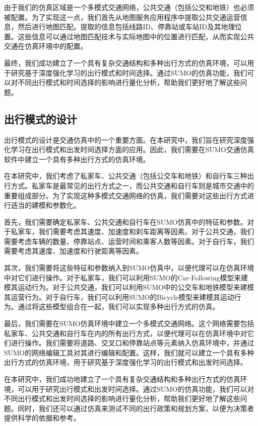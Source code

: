 由于我们的仿真区域是一个多模式交通网络，公共交通（包括公交和地铁）也必须被配置。为了实现这一点，我们首先从地图服务应用程序中提取公共交通运营信息，然后进行地图匹配。提取的信息包括线路ID、停靠站或车站ID及其地理位置。这些信息可以通过地图匹配技术与实际地图中的位置进行匹配，从而实现公共交通在仿真环境中的配置。

最终，我们成功建立了一个具有复杂交通结构和多种出行方式的仿真环境，可以用于研究基于深度强化学习的出行模式和时间选择。通过SUMO的仿真功能，我们可以对不同出行模式和时间选择的影响进行量化分析，帮助我们更好地了解这些问题。

\subsection{出行模式的设计}

出行模式的设计是交通仿真中的一个重要方面。在本研究中，我们旨在研究深度强化学习在出行模式和出发时间选择方面的应用。因此，我们需要在SUMO交通仿真软件中建立一个具有多种出行方式的仿真环境。

在本研究中，我们考虑了私家车、公共交通（包括公交车和地铁）和自行车三种出行方式。私家车是最常见的出行方式之一，而公共交通和自行车则是城市交通中的重要组成部分。为了实现这种多模式交通网络的仿真，我们需要对这些出行方式进行适当的建模和参数化。

首先，我们需要确定私家车、公共交通和自行车在SUMO仿真中的特征和参数。对于私家车，我们需要考虑其速度、加速度和刹车距离等因素。对于公共交通，我们需要考虑车辆的数量、停靠站点、运营时间和乘客人数等因素。对于自行车，我们需要考虑其速度、加速度和行驶距离等因素。

其次，我们需要将这些特征和参数纳入到SUMO仿真中，以便代理可以在仿真环境中对它们进行操作。对于私家车，我们可以利用SUMO的Car-Following模型来建模其运动行为。对于公共交通，我们可以利用SUMO中的公交车和地铁模型来建模其运营行为。对于自行车，我们可以利用SUMO的Bicycle模型来建模其运动行为。通过将这些模型组合在一起，我们可以实现多种出行方式的仿真。

最后，我们需要在SUMO仿真环境中建立一个多模式交通网络。这个网络需要包括私家车、公共交通和自行车在内的所有出行方式，以便代理可以在仿真环境中对它们进行操作。我们需要将道路、交叉口和停靠站点等元素纳入仿真环境中，并通过SUMO的网络编辑工具对其进行编辑和配置。这样，我们就可以建立一个具有多种出行方式的仿真环境，用于研究基于深度强化学习的出行模式和出发时间选择。

在本研究中，我们成功地建立了一个具有复杂交通结构和多种出行方式的仿真环境，可以用于研究出行模式和出发时间选择。通过SUMO的仿真功能，我们可以对不同出行模式和出发时间选择的影响进行量化分析，帮助我们更好地了解这些问题。同时，我们还可以通过仿真来测试不同的出行政策和规划方案，以便为决策者提供科学的依据和参考。

